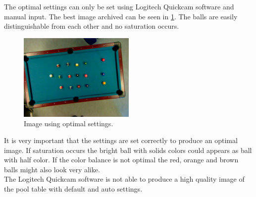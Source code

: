 The optimal settings can only be set using Logitech Quickcam software and manual input. The best image archived can be seen in \ref{fig:bestimgcamera}. The balls are easily distinguishable from each other and no saturation occurs.

\begin{figure}[H]
\begin{center}
\leavevmode
\includegraphics[width=0.5\textwidth]{images/good-from-program}
\end{center}
\caption{Image using optimal settings.}
\label{fig:bestimgcamera}
\end{figure} 

It is very important that the settings are set correctly to produce an optimal image. If saturation occurs the bright ball with solids colors could appears as ball with half color. If the color balance is not optimal the red, orange and brown balls might also look very alike.\\

The Logitech Quickcam software is not able to produce a high quality image of the pool table with default and auto settings.

